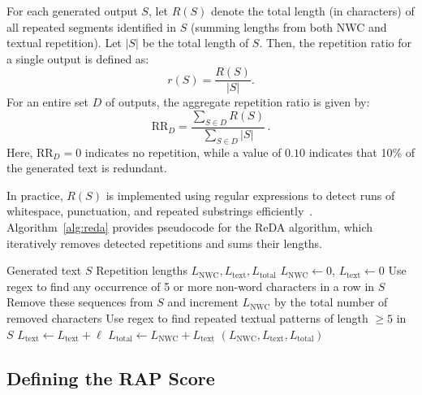 For each generated output $S$, let $R(S)$ denote the total length (in characters) of all repeated segments identified in $S$ (summing lengths from both NWC and textual repetition). Let $|S|$ be the total length of $S$. Then, the repetition ratio for a single output is defined as:
\[
r(S) = \frac{R(S)}{|S|}.
\]
For an entire set $D$ of outputs, the aggregate repetition ratio is given by:
\begin{equation}
\text{RR}_D = \frac{\sum_{S \in D} R(S)}{\sum_{S \in D} |S|}\,.\label{eq:rr_dataset}
\end{equation}
Here, $\text{RR}_D = 0$ indicates no repetition, while a value of $0.10$ indicates that 10\% of the generated text is redundant.

In practice, $R(S)$ is implemented using regular expressions to detect runs of whitespace, punctuation, and repeated substrings efficiently~\cite{huang2025rap}. Algorithm~\ref{alg:reda} provides pseudocode for the ReDA algorithm, which iteratively removes detected repetitions and sums their lengths.

\begin{algorithm}[htbp]
\caption{Repetition Detection (ReDA)~\cite{huang2025rap}}
\label{alg:reda}
\begin{algorithmic}[1]
\Require Generated text $S$
\Ensure Repetition lengths $L_{\text{NWC}}, L_{\text{text}}, L_{\text{total}}$
\State $L_{\text{NWC}} \gets 0$, $L_{\text{text}} \gets 0$
\State Use regex to find any occurrence of 5 or more non-word characters in a row in $S$
    \State Remove these sequences from $S$ and increment $L_{\text{NWC}}$ by the total number of removed characters
\EndIf
\State Use regex to find repeated textual patterns of length $\geq 5$ in $S$
    \State $L_{\text{text}} \gets L_{\text{text}} + \ell$ 
\EndFor
\State $L_{\text{total}} \gets L_{\text{NWC}} + L_{\text{text}}$
\State \Return $(L_{\text{NWC}}, L_{\text{text}}, L_{\text{total}})$
\end{algorithmic}
\end{algorithm}

\subsection{Defining the RAP Score}
\label{sec:rap_definition}

